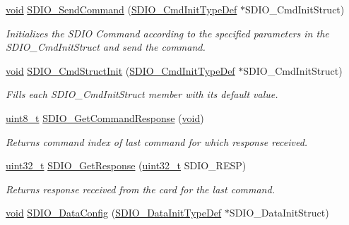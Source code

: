 \begin{DoxyCompactItemize}
\hyperlink{usb__devapi_8h_afabf60e7f57651d6d595a02c75f07cd0}{void} \hyperlink{group___s_d_i_o___private___functions_ga7117d2f702703f6c0a66bc07707cab23}{S\+D\+I\+O\+\_\+\+Send\+Command} (\hyperlink{struct_s_d_i_o___cmd_init_type_def}{S\+D\+I\+O\+\_\+\+Cmd\+Init\+Type\+Def} $\ast$S\+D\+I\+O\+\_\+\+Cmd\+Init\+Struct)
\begin{DoxyCompactList}\small\item\em Initializes the S\+D\+IO Command according to the specified parameters in the S\+D\+I\+O\+\_\+\+Cmd\+Init\+Struct and send the command. \end{DoxyCompactList}\item 
\hyperlink{usb__devapi_8h_afabf60e7f57651d6d595a02c75f07cd0}{void} \hyperlink{group___s_d_i_o___private___functions_ga09d9e89f49c87c82aec79c97b7068e24}{S\+D\+I\+O\+\_\+\+Cmd\+Struct\+Init} (\hyperlink{struct_s_d_i_o___cmd_init_type_def}{S\+D\+I\+O\+\_\+\+Cmd\+Init\+Type\+Def} $\ast$S\+D\+I\+O\+\_\+\+Cmd\+Init\+Struct)
\begin{DoxyCompactList}\small\item\em Fills each S\+D\+I\+O\+\_\+\+Cmd\+Init\+Struct member with its default value. \end{DoxyCompactList}\item 
\hyperlink{_p_e___types_8h_aba7bc1797add20fe3efdf37ced1182c5}{uint8\+\_\+t} \hyperlink{group___s_d_i_o___private___functions_ga9badf271c818e09da301d715c4ad0e5b}{S\+D\+I\+O\+\_\+\+Get\+Command\+Response} (\hyperlink{usb__devapi_8h_afabf60e7f57651d6d595a02c75f07cd0}{void})
\begin{DoxyCompactList}\small\item\em Returns command index of last command for which response received. \end{DoxyCompactList}\item 
\hyperlink{_p_e___types_8h_a33594304e786b158f3fb30289278f5af}{uint32\+\_\+t} \hyperlink{group___s_d_i_o___private___functions_ga5c1e859511840e8cca6a9a768bce220b}{S\+D\+I\+O\+\_\+\+Get\+Response} (\hyperlink{_p_e___types_8h_a33594304e786b158f3fb30289278f5af}{uint32\+\_\+t} S\+D\+I\+O\+\_\+\+R\+E\+SP)
\begin{DoxyCompactList}\small\item\em Returns response received from the card for the last command. \end{DoxyCompactList}\item 
\hyperlink{usb__devapi_8h_afabf60e7f57651d6d595a02c75f07cd0}{void} \hyperlink{group___s_d_i_o___private___functions_gad65d896ae919683585bda44a1e2afae4}{S\+D\+I\+O\+\_\+\+Data\+Config} (\hyperlink{struct_s_d_i_o___data_init_type_def}{S\+D\+I\+O\+\_\+\+Data\+Init\+Type\+Def} $\ast$S\+D\+I\+O\+\_\+\+Data\+Init\+Struct)

\end{DoxyCompactItemize}
